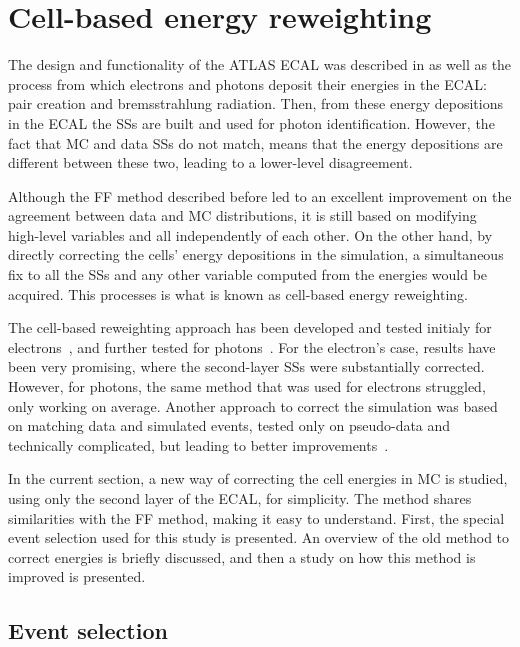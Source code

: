 \section{Cell-based energy reweighting}
\label{sec:ss_corrections:cell_rw}

The design and functionality of the \ac{ATLAS} \ac{ECAL} was described in \Sect{\ref{subsubsec:atlas:atlas:cals:ecal}} as well as the process from which electrons and photons deposit their energies in the \ac{ECAL}: pair creation and bremsstrahlung radiation. Then, from these energy depositions in the \ac{ECAL} the \acp{SS} are built and used for photon identification. However, the fact that \ac{MC} and data \acp{SS} do not match, means that the energy depositions are different between these two, leading to a lower-level disagreement.

Although the \acf{FF} method described before led to an excellent improvement on the agreement between data and \ac{MC} distributions, it is still based on modifying high-level variables and all independently of each other. On the other hand, by directly correcting the cells' energy depositions in the simulation, a simultaneous fix to all the \acfp{SS} and any other variable computed from the energies would be acquired. This processes is what is known as cell-based energy reweighting.

The cell-based reweighting approach has been developed and tested initialy for electrons~\cite{thesis_khandoga}, and further tested for photons~\cite{thesis_belfkir}. For the electron's case, results have been very promising, where the second-layer \acp{SS} were substantially corrected. However, for photons, the same method that was used for electrons struggled, only working on average. Another approach to correct the simulation was based on matching data and simulated events, tested only on pseudo-data and technically complicated, but leading to better  improvements~\cite{thesis_belfkir}.

In the current section, a new way of correcting the cell energies in \ac{MC} is studied, using only the second layer of the \ac{ECAL}, for simplicity. The method shares similarities with the \ac{FF} method, making it easy to understand.
First, the special event selection used for this study is presented. An overview of the old method to correct energies is briefly discussed, and then a study on how this method is improved is presented.





\subsection{Event selection}
\label{subsec:ss_corrections:cell_rw:event_selection}

